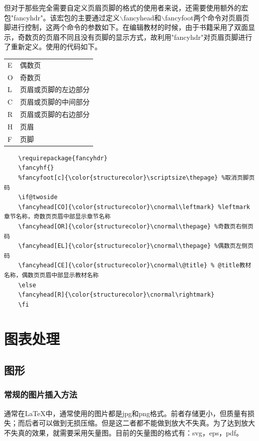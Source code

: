 \documentclass[12pt]{book}
\begin{document}
但对于那些完全需要自定义页眉页脚的格式的使用者来说，还需要使用额外的宏包"fancyhdr"。该宏包的主要通过定义$\backslash$fancyhead和$\backslash$fancyfoot两个命令对页眉页脚进行控制，这两个命令的参数如下。在编辑教材的时候，由于书籍采用了双面显示，奇数页的页眉不同且没有页脚的显示方式，故利用"fancyhdr"对页眉页脚进行了重新定义。使用的代码如下。
\begin{table}[h]
    \centering
    \begin{tabular}{ll}
        E &     偶数页\\
        O &     奇数页 \\
        L &     页眉或页脚的左边部分\\
        C &     页眉或页脚的中间部分\\
        R &     页眉或页脚的右边部分\\
        H &     页眉\\
        F &     页脚
    \end{tabular}
\end{table}
\begin{verbatim}
    \requirepackage{fancyhdr}
    \fancyhf{} 
    %fancyfoot[c]{\color{structurecolor}\scriptsize\thepage} %取消页脚页码
    \if@twoside
    \fancyhead[CO]{\color{structurecolor}\cnormal\leftmark} %leftmark章节名称，奇数页页眉中部显示章节名称
    \fancyhead[OR]{\color{structurecolor}\cnormal\thepage} %奇数页右侧页码
    \fancyhead[EL]{\color{structurecolor}\cnormal\thepage} %偶数页左侧页码
    \fancyhead[CE]{\color{structurecolor}\cnormal\@title} % @title教材名称，偶数页页眉中部显示教材名称
    \else
    \fancyhead[R]{\color{structurecolor}\cnormal\rightmark}
    \fi
\end{verbatim}



\chapter{图表处理}

\section{图形}


\subsection{常规的图片插入方法}

通常在\LaTeX{}中，通常使用的图片都是jpg和png格式。前者存储更小，但质量有损失；而后者可以做到无损压缩。但是这二者都不能做到放大不失真。为了达到放大不失真的效果，就需要采用矢量图。目前的矢量图的格式有：svg，eps，pdf。
\end{document}
